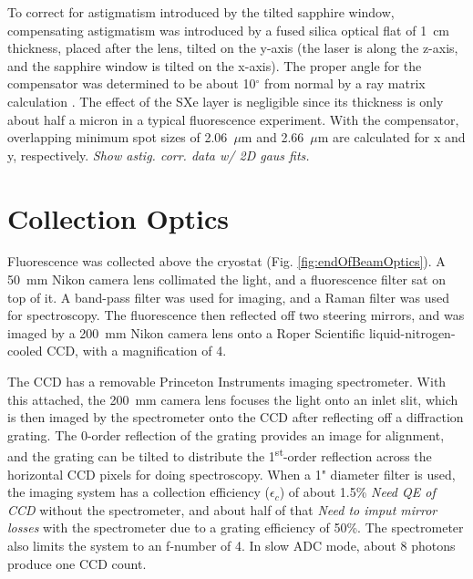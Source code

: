 To correct for astigmatism introduced by the tilted sapphire window, compensating astigmatism was introduced by a fused silica optical flat of 1~cm thickness, placed after the lens, tilted on the y-axis (the laser is along the z-axis, and the sapphire window is tilted on the x-axis).  The proper angle for the compensator was determined to be about 10$^{\circ}$ from normal by a ray matrix calculation \cite{raymatrix}.  The effect of the SXe layer is negligible since its thickness is only about half a micron in a typical fluorescence experiment.  With the compensator, overlapping minimum spot sizes of 2.06~$\mu$m and 2.66~$\mu$m are calculated for x and y, respectively.  \emph{\color{gray}Show astig. corr. data w/ 2D gaus fits.}



\section{Collection Optics}
\label{sec:collection}

Fluorescence was collected above the cryostat (Fig. \ref{fig:endOfBeamOptics}).  A 50~mm Nikon camera lens collimated the light, and a fluorescence filter sat on top of it.  A band-pass filter was used for imaging, and a Raman filter was used for spectroscopy.  The fluorescence then reflected off two steering mirrors, and was imaged by a 200~mm Nikon camera lens onto a Roper Scientific liquid-nitrogen-cooled CCD, with a magnification of 4.

The CCD has a removable Princeton Instruments imaging spectrometer.  With this attached, the 200~mm camera lens focuses the light onto an inlet slit, which is then imaged by the spectrometer onto the CCD after reflecting off a diffraction grating.  The 0-order reflection of the grating provides an image for alignment, and the grating can be tilted to distribute the 1\textsuperscript{st}-order reflection across the horizontal CCD pixels for doing spectroscopy.  When a 1" diameter filter is used, the imaging system has a collection efficiency ($\epsilon_{c}$) of about 1.5\% \emph{\color{gray}Need QE of CCD} without the spectrometer, and about half of that \emph{\color{gray}Need to imput mirror losses} with the spectrometer due to a grating efficiency of 50\%.  The spectrometer also limits the system to an f-number of 4.  In slow ADC mode, about {\color{red}8} photons produce one CCD count.

